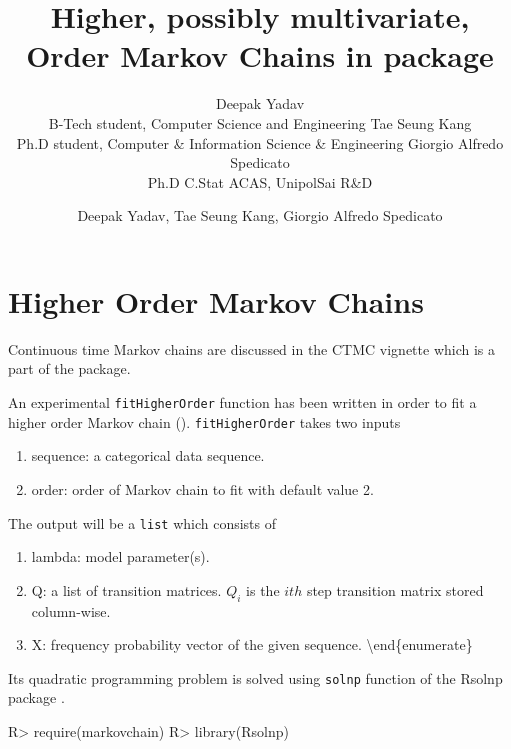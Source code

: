\documentclass[article,nojss]{jss}
\author{
Deepak Yadav\\B-Tech student, Computer Science and Engineering \And Tae Seung Kang\\Ph.D student, Computer \& Information Science \& Engineering \And Giorgio Alfredo Spedicato\\Ph.D C.Stat ACAS, UnipolSai R\&D
}
\title{Higher, possibly multivariate, Order Markov Chains in \pkg{markovchain} package}
\author{Deepak Yadav, Tae Seung Kang, Giorgio Alfredo Spedicato}
\providecommand{\tightlist}{%
  \setlength{\itemsep}{0pt}\setlength{\parskip}{0pt}}
\begin{document}
\hypertarget{higher-order-markov-chains}{%
\section{Higher Order Markov Chains}\label{higher-order-markov-chains}}

Continuous time Markov chains are discussed in the CTMC vignette which is a part of the package.

An experimental \texttt{fitHigherOrder} function has been written in order to fit a higher order Markov chain (\citep[\citet{ching2008higher}]{ching2013higher}).
\texttt{fitHigherOrder} takes two inputs

\begin{enumerate}
\def\labelenumi{\arabic{enumi}.}
\tightlist
\item
  sequence: a categorical data sequence.
\item
  order: order of Markov chain to fit with default value 2.
\end{enumerate}

The output will be a \texttt{list} which consists of

\begin{enumerate}
\def\labelenumi{\arabic{enumi}.}
\tightlist
\item
  lambda: model parameter(s).
\item
  Q: a list of transition matrices. \(Q_i\) is the \(ith\) step transition matrix stored column-wise.
\item
  X: frequency probability vector of the given sequence.
  \textbackslash{}end\{enumerate\}
\end{enumerate}

Its quadratic programming problem is solved using \texttt{solnp} function of the Rsolnp package \citep{pkg:Rsolnp}.

\begin{CodeChunk}

\begin{CodeInput}
R> require(markovchain)
R> library(Rsolnp)
\end{CodeInput}
\end{CodeChunk}
\end{document}
